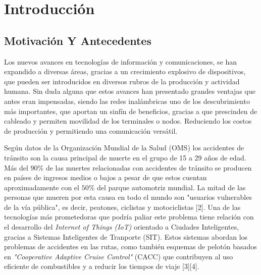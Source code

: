 \chapter{Introducción}
    
\section{Motivación Y Antecedentes}



Los nuevos avances en tecnologías de información y comunicaciones, se han expandido a diversas áreas, gracias a un crecimiento explosivo de dispositivos, que pueden ser introducidos en diversos rubros de la producción y actividad humana.  Sin duda alguna que estos avances han presentado grandes ventajas que antes eran impensadas, siendo las redes inalámbricas uno de los descubrimiento más importantes, que aportan un sinfín de beneficios, gracias a que prescinden de cableado y permiten movilidad de los terminales o nodos. Reduciendo los costos de producción y permitiendo una comunicación versátil.

Según datos de la Organización Mundial de la Salud (OMS) los accidentes de tránsito son la causa principal de muerte en el grupo de 15 a 29 años de edad. Más del $90\%$ de las muertes relacionadas con accidentes de tránsito se producen en países de ingresos medios o bajos a pesar de que estos cuentan aproximadamente con el $50\%$ del parque automotriz mundial. La mitad de las personas que mueren por esta causa en todo el mundo son "usuarios vulnerables de la vía pública", es decir, peatones, ciclistas y motociclistas [2]. Una de las tecnologías más prometedoras que podría paliar este problema tiene relación con el desarrollo del \textit{Internet of Things (IoT)} orientado a Ciudades Inteligentes, gracias a Sistemas Inteligentes de Tranporte (SIT). Estos sistemas abordan los problemas de accidentes en las rutas, como también esquemas de pelotón basados en \textit{"Cooperative Adaptive Cruise Control"} (CACC) que contribuyen al uso eficiente de combustibles y a reducir los tiempos de viaje [3][4].

